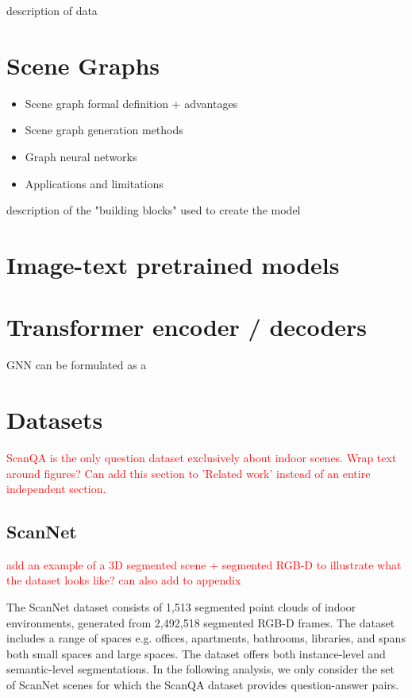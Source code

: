 description of data
\section{Scene Graphs}
\begin{itemize}
    \item Scene graph formal definition + advantages
    \item Scene graph generation methods
    \item Graph neural networks
    \item Applications and limitations
\end{itemize}


description of the "building blocks" used to create the model
\section{Image-text pretrained models}

\section{Transformer encoder / decoders}
GNN can be formulated as a 

\section{Datasets}

\textcolor{red}{ScanQA is the only question dataset exclusively about indoor scenes.}
\textcolor{red}{Wrap text around figures?}
\textcolor{red}{Can add this section to 'Related work' instead of an entire independent section.}


\subsection{ScanNet}
\textcolor{red}{add an example of a 3D segmented scene + segmented RGB-D to illustrate what the dataset looks like? can also add to appendix}

The ScanNet dataset consists of 1,513 segmented point clouds of indoor environments, generated from 2,492,518 segmented RGB-D frames. The dataset includes a range of spaces e.g. offices, apartments, bathrooms, libraries, and spans both small spaces and large spaces. The dataset offers both instance-level and semantic-level segmentations. In the following analysis, we only consider the set of ScanNet scenes for which the ScanQA dataset provides question-answer pairs.

